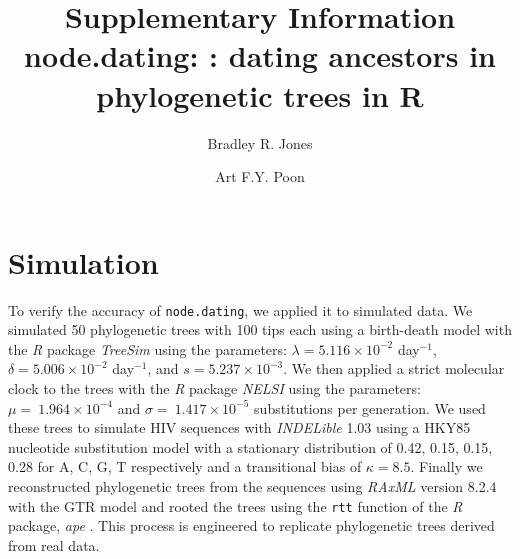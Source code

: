\documentclass{article}
\newcommand{\code}[1]{{\tt #1}}
\begin{document}
\title{Supplementary Information \\ node.dating: : dating ancestors in phylogenetic trees in R}

\author[1,2,*]{Bradley R. Jones}
\author[2,3]{Art F.Y. Poon}

\date{}

\maketitle

\section{Simulation} \label{sec:sim}
To verify the accuracy of \code{node.dating}, we applied it to simulated data.
We simulated 50 phylogenetic trees with 100 tips each using a birth-death model with the \emph{R} package \emph{TreeSim} \citep{TreeSim} using the parameters: $\lambda = 5.116 \times 10^{-2}$ day$^{-1}$, $\delta = 5.006 \times 10^{-2}$ day$^{-1}$, and $s = 5.237 \times 10^{-3}$.
We then applied a strict molecular clock to the trees with the \emph{R} package \emph{NELSI} \citep{NELSI} using the parameters: $\mu = \ 1.964\times 10^{-4}$ and $\sigma = \ 1.417\times 10^{-5}$ substitutions per generation.
We used these trees to simulate HIV sequences with \emph{INDELible} 1.03 \citep{Indelible09} using a HKY85 nucleotide substitution model \cite{HKY85} with a stationary distribution of 0.42, 0.15, 0.15, 0.28 for A, C, G, T respectively and a transitional bias of $\kappa = 8.5$.
Finally we reconstructed phylogenetic trees from the sequences using \emph{RAxML} version 8.2.4 \citep{Raxml14} with the GTR model and rooted the trees using the \code{rtt} function of the \emph{R} package, \emph{ape} \citep{APE}.
This process is engineered to replicate phylogenetic trees derived from real data.
\end{document}
